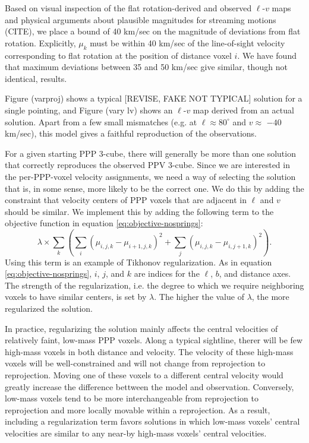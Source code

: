 Based on visual inspection of the flat rotation-derived and observed $\ell$-$v$ maps and physical arguments about plausible magnitudes for streaming motions (CITE), we place a bound of 40 km/sec on the magnitude of deviations from flat rotation. Explicitly, $\mu_k$ must be within 40 km/sec of the line-of-sight velocity corresponding to flat rotation at the position of distance voxel $i$. We have found that maximum deviations between 35 and 50 km/sec give similar, though not identical, results.

Figure (varproj) shows a typical [REVISE, FAKE NOT TYPICAL] solution for a single pointing, and Figure (vary lv) shows an $\ell$-$v$ map derived from an actual solution. Apart from a few small mismatches (e.g. at $\ell \approx 80^\circ$ and $v\approx$ $-40$ km/sec), this model gives a faithful reproduction of the observations.

For a given starting PPP 3-cube, there will generally be more than one solution that correctly reproduces the observed PPV 3-cube. Since we are interested in the per-PPP-voxel velocity assignments, we need a way of selecting the solution that is, in some sense, more likely to be the correct one. We do this by adding the constraint that velocity centers of PPP voxels that are adjacent in $\ell$ and $v$ should be similar. We implement this by adding the following term to the objective function in equation \ref{eq:objective-nosprings}:
\begin{equation}
    \lambda \times \sum_k \left( \sum_i (\mu_{i,j,k} - \mu_{i+1,j,k})^2 + 
    \sum_j (\mu_{i,j,k} - \mu_{i,j+1,k})^2 \right).
\end{equation}
Using this term is an example of Tikhonov regularization. As in equation \ref{eq:objective-nosprings}, $i$, $j$, and $k$ are indices for the $\ell$, $b$, and distance axes. The strength of the regularization, i.e. the degree to which we require neighboring voxels to have similar centers, is set by $\lambda$. The higher the value of $\lambda$, the more regularized the solution.

In practice, regularizing the solution mainly affects the central velocities of relatively faint, low-mass PPP voxels. Along a typical sightline, therer will be few high-mass voxels in both distance and velocity. The velocity of these high-mass voxels will be well-constrained and will not change from reprojection to reprojection. Moving one of these voxels to a different central velocity would greatly increase the difference bettween the model and observation. Conversely, low-mass voxels tend to be more interchangeable from reprojection to reprojection and more locally movable within a reprojection. As a result, including a regularization term favors solutions in which low-mass voxels' central velocities are similar to any near-by high-mass voxels' central velocities.

